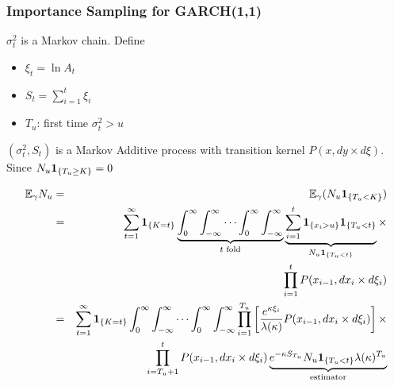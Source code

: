 \documentclass{beamer}
\begin{document}
\begin{frame}
  \frametitle{Importance Sampling for GARCH(1,1)}
  $\sigma_{t}^2$ is a Markov chain. Define
  \begin{itemize}
  \item $\xi_t = \ln A_t$
  \item $S_t = \sum_{i=1}^{t} \xi_i$
  \item $T_u$: first time $\sigma_t^2 > u$
  \end{itemize}
  $(\sigma_t^2, S_t)$ is a Markov Additive process with
  transition kernel $P(x, dy \times d\xi)$. Since $N_u \mathbf{1}_{\{T_u \geq
    K\}} = 0$
  \begin{footnotesize}
    \begin{eqnarray*}
      \mathbb{E}_\gamma N_u &=& \mathbb{E}_\gamma(N_u\mathbf{1}_{\{T_u < K\}}) \\
      &=& \sum_{t=1}^\infty
      \mathbf{1}_{\{K=t\}}
      \underbrace{
        \int_0^\infty \int_{-\infty}^\infty
        \cdots
        \int_0^\infty \int_{-\infty}^\infty
      }_{t \text{ fold}}
      \underbrace{
        \sum_{i=1}^{t} \mathbf{1}_{\{x_i > u\}} \mathbf{1}_{\{T_u < t\}}
      }_{N_u \mathbf{1}_{\{T_u < t\}}} \times \\
      &&
      \prod_{i=1}^{t} P(x_{i-1}, d x_{i} \times d\xi_{i})\\
      &=&
      \sum_{t=1}^\infty
      \mathbf{1}_{\{K=t\}}
      \int_0^\infty \int_{-\infty}^\infty
      \cdots
      \int_0^\infty \int_{-\infty}^\infty
      \prod_{i=1}^{T_u} \left[
        {e^{\kappa \xi_i} \over \lambda(\kappa)}
        P(x_{i-1}, d x_{i} \times d\xi_{i})
        \right] \times \\
      &&
      \prod_{i=T_u + 1}^{t} P(x_{i-1}, dx_{i} \times d\xi_i)
      \underbrace{
        e^{-\kappa S_{T_u}} N_u\mathbf{1}_{\{T_u < t\}} \lambda(\kappa)^{T_u}
      }_{\text{estimator}}
    \end{eqnarray*}
  \end{footnotesize}
\end{frame}
\end{document}
